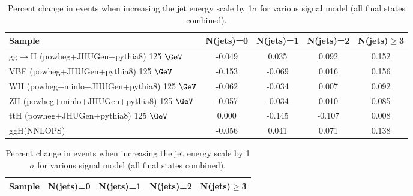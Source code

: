 \documentclass{article}
\begin{document}
\begin{table}[!h!tb]
\begin{center}
\small
\caption{
Percent change in events when increasing the jet energy scale by 1$\sigma$ for various signal model (all final states combined).
\label{tab:jesSM}
}
\begin{tabular}{|l|c|c|c|c|} \hline 
Sample & N(jets)=0 & N(jets)=1 & N(jets)=2 & N(jets)$\geq$3 \\ \hline 
gg$\rightarrow$H ({\sc powheg+JHUGen+pythia8}) 125 $\GeV$ & -0.049 & 0.035 & 0.092 & 0.152 \\ 
VBF ({\sc powheg+JHUGen+pythia8}) 125 $\GeV$ & -0.153 & -0.069 & 0.016 & 0.156 \\ 
WH ({\sc powheg+minlo+JHUGen+pythia8}) 125 $\GeV$ & -0.062 & -0.034 & 0.007 & 0.092 \\ 
ZH ({\sc powheg+minlo+JHUGen+pythia8}) 125 $\GeV$ & -0.057 & -0.034 & 0.010 & 0.085 \\ 
ttH ({\sc powheg+JHUGen+pythia8}) 125 $\GeV$ & 0.000 & -0.145 & -0.107 & 0.008 \\ 
ggH(NNLOPS) & -0.056 & 0.041 & 0.071 & 0.138 \\ 

\hline
\end{tabular}
\normalsize
\end{center}
\end{table}
 
 
 
\begin{table}[!h!tb]
\begin{center}
\small
\caption{
Percent change in events when increasing the jet energy scale by 1$\sigma$ for various signal model (all final states combined).
\label{tab:jesExo}
}
\begin{tabular}{|l|c|c|c|c|} \hline 
Sample & N(jets)=0 & N(jets)=1 & N(jets)=2 & N(jets)$\geq$3 \\ \hline 

\hline
\end{tabular}
\normalsize
\end{center}
\end{table}
\end{document}
